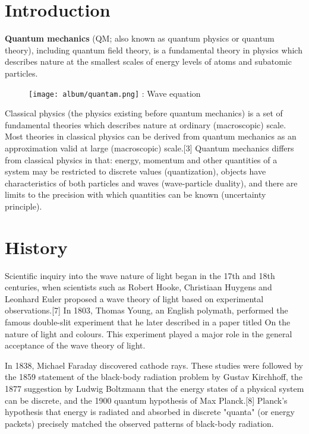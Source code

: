\documentclass{article}
\author{MD.Omer Danish\\
Student ID: 1505053}
\date{\today}
\begin{document}
\section{Introduction}

\textbf{Quantum mechanics} (QM; also known as quantum physics or quantum theory), including quantum field theory, is a fundamental theory in physics which describes nature at the smallest scales of energy levels of atoms and subatomic particles.

\begin{figure}
    \centering
\texttt{[image: album/quantam.png]}
    \captioig: Wave equation
\end{figure}

Classical physics (the physics existing before quantum mechanics) is a set of fundamental theories which describes nature at ordinary (macroscopic) scale. Most theories in classical physics can be derived from quantum mechanics as an approximation valid at large (macroscopic) scale.[3] Quantum mechanics differs from classical physics in that: energy, momentum and other quantities of a system may be restricted to discrete values (quantization), objects have characteristics of both particles and waves (wave-particle duality), and there are limits to the precision with which quantities can be known (uncertainty principle).



\section{History}


Scientific inquiry into the wave nature of light began in the 17th and 18th centuries, when scientists such as Robert Hooke, Christiaan Huygens and Leonhard Euler proposed a wave theory of light based on experimental observations.[7] In 1803, Thomas Young, an English polymath, performed the famous double-slit experiment that he later described in a paper titled On the nature of light and colours. This experiment played a major role in the general acceptance of the wave theory of light.

In 1838, Michael Faraday discovered cathode rays. These studies were followed by the 1859 statement of the black-body radiation problem by Gustav Kirchhoff, the 1877 suggestion by Ludwig Boltzmann that the energy states of a physical system can be discrete, and the 1900 quantum hypothesis of Max Planck.[8] Planck's hypothesis that energy is radiated and absorbed in discrete "quanta" (or energy packets) precisely matched the observed patterns of black-body radiation.
\end{document}
